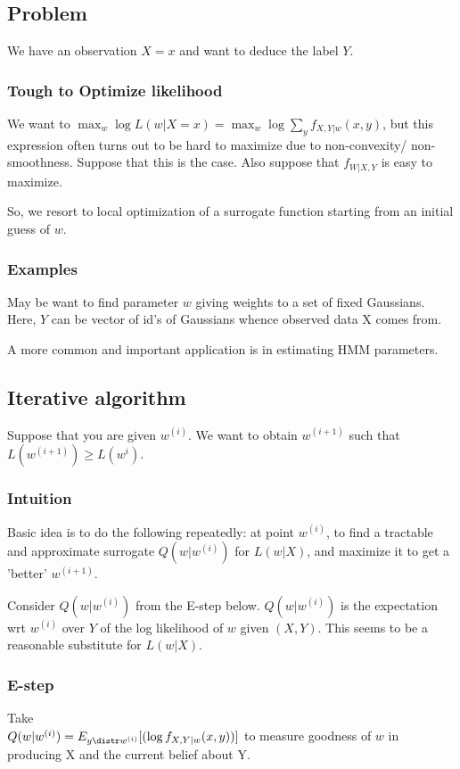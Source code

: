 \documentclass[oneside, article]{memoir}
\begin{document}
\subsection{Problem}
We have an observation $X=x$ and want to deduce the label $Y$.

\subsubsection{Tough to Optimize likelihood}
We want to $\max_w \log L(w|X=x) = \max_w \log \sum_y f_{X, Y|w}(x, y)$, but this expression often turns out to be hard to maximize due to non-convexity/ non-smoothness. Suppose that this is the case. Also suppose that $f_{W|X, Y}$ is easy to maximize.

So, we resort to local optimization of a surrogate function starting from an initial guess of $w$.

\subsubsection{Examples}
May be want to find parameter $w$ giving weights to a set of fixed Gaussians. Here, $Y$ can be vector of id's of Gaussians whence observed data X comes from.

A more common and important application is in estimating HMM parameters.

\subsection{Iterative algorithm}
Suppose that you are given $w^{(i)}$. We want to obtain $w^{(i+1)}$ such that $L(w^{(i+1)}) \geq L(w^{i})$.

\subsubsection{Intuition}
Basic idea is to do the following repeatedly: at point $w^{(i)}$, to find a tractable and approximate surrogate $Q(w| w^{(i)})$ for $L(w|X)$, and maximize it to get a 'better' $w^{(i+1)}$.

Consider $Q(w| w^{(i)})$ from the E-step below. $Q(w|w^{(i)})$ is the expectation wrt $w^{(i)}$ over $Y$ of the log likelihood of $w$ given $(X, Y)$. This seems to be a reasonable substitute for $L(w|X)$.

\subsubsection{E-step}
Take \\
$Q(w | w^{(i)}) = E_{y \distr w^{(i)}}[(\log f_{X, Y|w}(x, y))]$ to measure goodness of $w$ in producing X and the current belief about Y.
\end{document}
